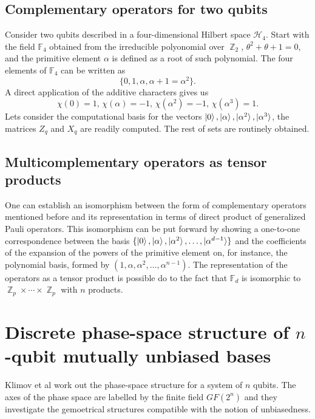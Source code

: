 \documentclass[a4paper]{article}
\DeclareMathOperator{\Z}{\mathbb{Z}}
\begin{document}
  \subsection{Complementary operators for two qubits}

  Consider two qubits described in a four-dimensional
  Hilbert space $\mathcal{H}_4$. Start with the field
  $\mathbb{F}_4$ obtained from the irreducible polyonomial
  over $\Z_2$, $\theta^2+\theta+1 = 0$, and the primitive
  element $\alpha$ is defined as a root of such polynomial.
  The four elements of $\mathbb{F}_4$ can be written as
  \[
    \{0,1,\alpha,\alpha+1 = \alpha^2\}.
  \] 
  A direct application of the additive characters gives us
  \[
    \chi(0) = 1,
    \,
    \chi(\alpha) = -1,
    \,
    \chi(\alpha^2) = -1,
    \,
    \chi(\alpha^3) = 1.
  \] 
  Lets consider the computational basis for the
  vectors $\ket 0, \ket \alpha, \ket{\alpha^2},
  \ket{\alpha^3}$, the matrices $Z_q$ and $X_q$ are readily
  computed. The rest of sets are routinely obtained.

  \subsection{Multicomplementary operators as tensor
  products}

  One can establish an isomorphism between the form of
  complementary operators mentioned before and its
  representation in terms of direct product of generalized
  Pauli operators. This isomorphism can be put forward by
  showing a one-to-one correspondence between the basis
  $\{\ket 0, \ket{\alpha},
  \ket{\alpha^2},\ldots,\ket{\alpha^{d-1}}\}$ and the
  coefficients of the expansion of the powers of the
  primitive element on, for instance, the polynomial basis,
  formed by $(1,\alpha,\alpha^2,\ldots,\alpha^{n-1})$. The
  representation of the operators as a tensor product is
  possible do to the fact that $\mathbb{F}_d$ is isomorphic
  to $\Z_p \times \cdots \times \Z_p$ with $n$ products.

  \section{Discrete phase-space structure of $n$-qubit
  mutually unbiased bases}

  Klimov et al work out the phase-space structure for a
  system of $n$ qubits. The axes of the phase space are
  labelled by the finite field $GF(2^{n})$ and they
  investigate the gemoetrical structures compatible with the
  notion of unbiasedness.
\end{document}
